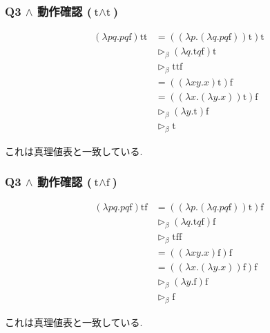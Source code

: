 \begin{frame}[fragile]

\frametitle{Q3 $\land$ 動作確認 ($\text{t}\land \text{t}$)}

\begin{align*}
(\lambda pq.pq\mathrm{f})\mathrm{tt}
&=
((\lambda p.(\lambda q.pq\mathrm{f}))
\mathrm{t})\mathrm{t}
\\
&\triangleright_{\beta}
(\lambda q.\mathrm{t}q\mathrm{f})\mathrm{t}
\\
&\triangleright_{\beta}
\mathrm{ttf}
\\
&=
((\lambda xy.x)\mathrm{t})\mathrm{f}
\\
&=
((\lambda x.(\lambda y.x))
\mathrm{t})\mathrm{f}
\\
&\triangleright_{\beta}
(\lambda y.\mathrm{t})\mathrm{f}
\\
&\triangleright_{\beta}
\mathrm{t}
\end{align*}

これは真理値表と一致している.

\end{frame}

\begin{frame}[fragile]

\frametitle{Q3 $\land$ 動作確認 ($\text{t}\land \text{f}$)}

\begin{align*}
(\lambda pq.pq\mathrm{f})\mathrm{tf}
&=
((\lambda p.(\lambda q.pq\mathrm{f}))
\mathrm{t})\mathrm{f}
\\
&\triangleright_{\beta}
(\lambda q.\mathrm{t}q\mathrm{f})\mathrm{f}
\\
&\triangleright_{\beta}
\mathrm{tff}
\\
&=
((\lambda xy.x)\mathrm{f})\mathrm{f}
\\
&=
((\lambda x.(\lambda y.x))
\mathrm{f})\mathrm{f}
\\
&\triangleright_{\beta}
(\lambda y.\mathrm{f})\mathrm{f}
\\
&\triangleright_{\beta}
\mathrm{f}
\end{align*}

これは真理値表と一致している.

\end{frame}

